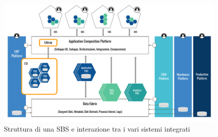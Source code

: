 \begin{figure}
    \centering
    \includegraphics[width=\linewidth]{figures/struttura-sbs.pdf}
    \caption{Struttura di una \ac{SBS} e interazione tra i vari sistemi integrati}
    \label{fig:sbs}
\end{figure}

